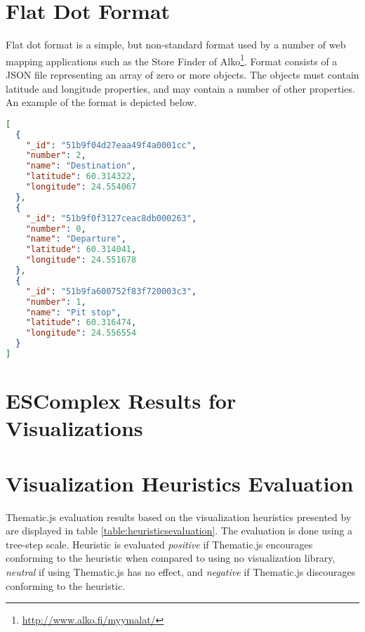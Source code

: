 
\chapter{Flat Dot Format}
\label{appendix:flatdotformat}

Flat dot format is a simple, but non-standard format used by a number of web mapping applications such as the Store Finder of Alko\footnote{\url{http://www.alko.fi/myymalat/}}. Format consists of a JSON file representing an array of zero or more objects. The objects must contain latitude and longitude properties, and may contain a number of other properties. An example of the format is depicted below.

\begin{lstlisting}[language=json]
[
  {
    "_id": "51b9f04d27eaa49f4a0001cc",
    "number": 2,
    "name": "Destination",
    "latitude": 60.314322,
    "longitude": 24.554067
  },
  {
    "_id": "51b9f0f3127ceac8db000263",
    "number": 0,
    "name": "Departure",
    "latitude": 60.314041,
    "longitude": 24.551678
  },
  {
    "_id": "51b9fa600752f83f720003c3",
    "number": 1,
    "name": "Pit stop",
    "latitude": 60.316474,
    "longitude": 24.556554
  }
]
\end{lstlisting}

\chapter{ESComplex Results for Visualizations}
\label{appendix:escomplex}


\chapter{Visualization Heuristics Evaluation}
\label{appendix:heuristicsevaluation}

Thematic.js evaluation results based on the visualization heuristics presented by \citet{zuk_heuristics_2006} are displayed in table \ref{table:heuristicsevaluation}. The evaluation is done using a tree-step scale. Heuristic is evaluated \emph{positive} if Thematic.js encourages conforming to the heuristic when compared to using no visualization library, \emph{neutral} if using Thematic.js has no effect, and \emph{negative} if Thematic.js discourages conforming to the heuristic.

